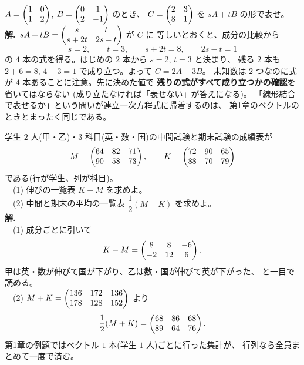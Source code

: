 \begin{rei}[例題・標準(行列の線形結合)]
$A = \begin{pmatrix}1 & 0 \\ 1 & 2\end{pmatrix}$, $B = \begin{pmatrix}0 & 1 \\ 2 & -1\end{pmatrix}$ のとき、
$C = \begin{pmatrix}2 & 3 \\ 8 & 1\end{pmatrix}$ を $sA + tB$ の形で表せ。\\
\textbf{解.}\ $sA + tB = \begin{pmatrix}s & t \\ s + 2t & 2s - t\end{pmatrix}$ が $C$ に
等しいとおくと、成分の比較から
\[
s = 2, \qquad t = 3, \qquad s + 2t = 8, \qquad 2s - t = 1
\]
の $4$ 本の式を得る。はじめの $2$ 本から $s = 2$, $t = 3$ と決まり、
残る $2$ 本も $2 + 6 = 8$, $4 - 3 = 1$ で成り立つ。よって $C = 2A + 3B$。
未知数は $2$ つなのに式が $4$ 本あることに注意。先に決めた値で
\textbf{残りの式がすべて成り立つかの確認}を省いてはならない
(成り立たなければ「表せない」が答えになる)。
「線形結合で表せるか」という問いが連立一次方程式に帰着するのは、
第1章のベクトルのときとまったく同じである。
\end{rei}

\begin{rei}[例題・標準(データの集計)]\label{rei:seihyou}
学生 $2$ 人(甲・乙)・$3$ 科目(英・数・国)の中間試験と期末試験の成績表が
\[
M = \begin{pmatrix}64 & 82 & 71 \\ 90 & 58 & 73\end{pmatrix}, \qquad
K = \begin{pmatrix}72 & 90 & 65 \\ 88 & 70 & 79\end{pmatrix}
\]
である(行が学生、列が科目)。\\
　(1) 伸びの一覧表 $K - M$ を求めよ。\\
　(2) 中間と期末の平均の一覧表 $\dfrac{1}{2}(M + K)$ を求めよ。\\
\textbf{解.}\\
　(1) 成分ごとに引いて
\[
K - M = \begin{pmatrix}8 & 8 & -6 \\ -2 & 12 & 6\end{pmatrix}.
\]
甲は英・数が伸びて国が下がり、乙は数・国が伸びて英が下がった、
と一目で読める。\\
　(2) $M + K = \begin{pmatrix}136 & 172 & 136 \\ 178 & 128 & 152\end{pmatrix}$ より
\[
\frac{1}{2}(M + K) = \begin{pmatrix}68 & 86 & 68 \\ 89 & 64 & 76\end{pmatrix}.
\]
第1章の例題ではベクトル $1$ 本(学生 $1$ 人)ごとに行った集計が、
行列なら全員まとめて一度で済む。
\end{rei}

